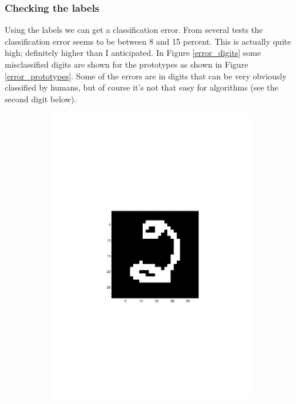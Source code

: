 \documentclass[paper=a4, fontsize=10pt]{scrartcl} %
\numberwithin{equation}{section} %
\numberwithin{figure}{section} %
\numberwithin{table}{section} %
\begin{document}
\subsubsection{Checking the labels}
Using the labels we can get a classification error. From several tests the classification error seems to be between 8 and 15 percent. This is actually quite high; definitely higher than I anticipated. In Figure \ref{error_digits} some misclassified digits are shown for the prototypes as shown in Figure \ref{error_prototypes}. Some of the errors are in digits that can be very obviously classified by humans, but of course it's not that easy for algorithms (see the second digit below).

\begin{figure}[H]
	\centering
	\begin{subfigure}[b]{0.3\textwidth}
                \includegraphics[width=\textwidth]{error_1}

\end{subfigure}
\end{figure}
\end{document}
